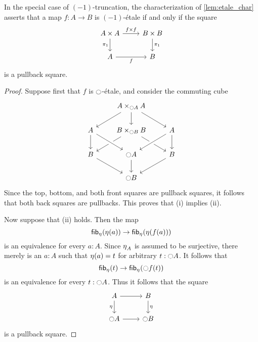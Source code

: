 \documentclass[9pt,twosided]{amsart}
\begin{document}
\begin{rmk}\label{rmk:-1etale}
In the special case of $(-1)$-truncation, the characterization of \cref{lem:etale_char} asserts that a map $f:A\to B$ is $(-1)$-\'etale if and only if the square
\begin{equation*}
\begin{tikzcd}
A\times A \arrow[d,swap,"\pi_1"] \arrow[r,"{f\times f}"] & B\times B \arrow[d,"\pi_1"] \\
A \arrow[r,swap,"f"] & B
\end{tikzcd}
\end{equation*}
is a pullback square.
\end{rmk}

\begin{proof}
Suppose first that $f$ is ${\ocircle}$-\'etale, and consider the commuting cube
\begin{equation*}
\begin{tikzcd}
& A\times_{\modal A} A \arrow[dl] \arrow[d] \arrow[dr] \\
A \arrow[d] & B\times_{\modal B} B \arrow[dl] \arrow[dr] & A \arrow[dl,crossing over] \arrow[d] \\
B \arrow[dr] & \modal A \arrow[from=ul,crossing over] \arrow[d] & B \arrow[dl] \\
& \modal B
\end{tikzcd}
\end{equation*}
Since the top, bottom, and both front squares are pullback squares, it follows that both back squares are pullbacks. This proves that (i) implies (ii).

Now suppose that (ii) holds. Then the map
\begin{equation*}
\fib{\modalunit}{\modalunit(a)}\to \fib{\modalunit}{\modalunit(f(a))}
\end{equation*}
is an equivalence for every $a:A$. Since ${\eta_{}}_A$ is assumed to be surjective, there merely is an $a:A$ such that ${\eta_{}}(a)=t$ for arbitrary $t:{\ocircle} A$.
It follows that
\begin{equation*}
\fib{\modalunit}{t}\to \fib{\modalunit}{\modal f(t)}
\end{equation*}
is an equivalence for every $t:{\ocircle} A$. Thus it follows that the square
\begin{equation*}
\begin{tikzcd}
A \arrow[d,swap,"\modalunit"] \arrow[r] & B \arrow[d,"\modalunit"] \\
\modal A \arrow[r] & \modal B
\end{tikzcd}
\end{equation*}
is a pullback square.
\end{proof}
\end{document}
